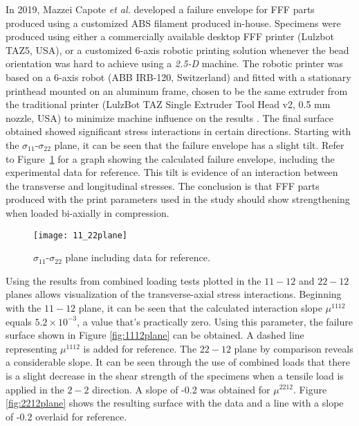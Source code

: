 \documentclass[main.tex]{subfiles}
\begin{document}
In 2019, Mazzei Capote \emph{et al.} \cite{MazzeiCapote2019} developed a failure envelope for FFF parts produced using a customized ABS filament produced in-house. Specimens were produced using either a commercially available desktop FFF printer (Lulzbot TAZ5, USA), or a customized 6-axis robotic printing solution whenever the bead orientation was hard to achieve using a \emph{2.5-D} machine. The robotic printer was based on a 6-axis robot (ABB IRB-120, Switzerland) and fitted with a stationary printhead mounted on an aluminum frame, chosen to be the same extruder from the traditional printer (LulzBot TAZ Single Extruder Tool Head v2, 0.5 mm nozzle, USA) to minimize machine influence on the results \cite{VanHulle2017}. The final surface obtained showed significant stress interactions in certain directions. Starting with the $\sigma_{11}$-$\sigma_{22}$ plane, it can be seen that the failure envelope has a slight tilt. Refer to Figure~\ref{fig:1122plane} for a graph showing the calculated failure envelope, including the experimental data for reference. This tilt is evidence of an interaction between the transverse and longitudinal stresses. The conclusion is that FFF parts produced with the print parameters used in the study should show strengthening when loaded bi-axially in compression.

\begin{figure}[h]
	\center
	\texttt{[image: 11\_22plane]}
	\captionsetup{justification=centering} %
	\caption[failure envelope in the $\sigma_{11}$-$\sigma_{22}$ plane]{$\sigma_{11}$-$\sigma_{22}$ plane including data for reference.} \label{fig:1122plane}
\end{figure}

\pagebreak

Using the results from combined loading tests plotted in the $11-12$ and $22-12$ planes allows visualization of the transverse-axial stress interactions. Beginning with the $11-12$ plane, it can be seen that the calculated interaction slope $\mu^{1112}$ equals $5.2\times 10^{-3}$, a value that's practically zero. Using this parameter, the failure surface shown in Figure \ref{fig:1112plane} can be obtained. A dashed line representing $\mu^{1112}$ is added for reference. The $22-12$ plane by comparison reveals a considerable slope. It can be seen through the use of combined loads that there is a slight decrease in the shear strength of the specimens when a tensile load is applied in the $2-2$ direction. A slope of -0.2 was obtained for $\mu^{2212}$. Figure \ref{fig:2212plane} shows the resulting surface with the data and a line with a slope of -0.2 overlaid for reference.
\end{document}
